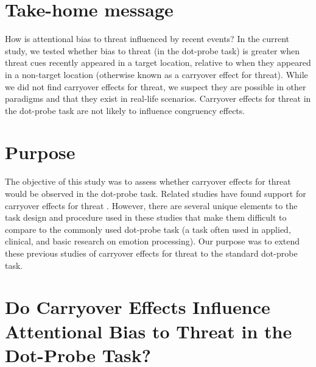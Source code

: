 \documentclass{article}
\begin{document}
	\section{Take-home message}



	{\color{4472C4}How is attentional bias to threat influenced by recent events? }{\color{4472C4}In the current study, we tested whether bias to threat (in the dot-probe task) is greater when threat cues recently appeared in a target location, relative to when they appeared in a non-target location (otherwise known as a carryover effect for threat). }{\color{4472C4}While we did not find carryover effects for threat, we suspect they are possible in other paradigms and that they exist in real-life scenarios. }{\color{4472C4}Carryover effects for threat in the dot-probe task are not likely to influence congruency effects.}







	\section{Purpose }



	The objective of this study was to assess whether carryover effects for threat would be observed in the dot-probe task. Related studies have found support for carryover effects for threat \textcite{[object Object], [object Object], [object Object], [object Object], [object Object]}. However, there are several unique elements to the task design and procedure used in these studies that make them difficult to compare to the commonly used dot-probe task (a task often used in applied, clinical, and basic research on emotion processing). Our purpose was to extend these previous studies of carryover effects for threat to the standard dot-probe task.























	\section{Do Carryover Effects Influence Attentional Bias to Threat in the Dot-Probe Task?}
\end{document}
